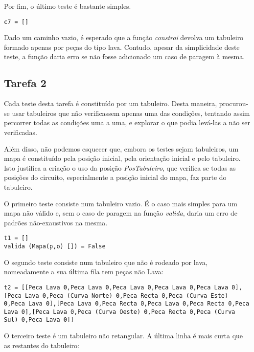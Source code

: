 \documentclass[a4paper]{report}
\begin{document}
Por fim, o último teste é bastante simples.

\begin{verbatim}
c7 = []
\end{verbatim}

Dado um caminho vazio, é esperado que a função \textit{constroi} devolva um tabuleiro formado apenas por peças do tipo lava. Contudo, apesar da simplicidade deste teste, a função daria erro se não fosse adicionado um caso de paragem à mesma.

\subsection{Tarefa 2}

Cada teste desta tarefa é constituído por um tabuleiro. Desta maneira, procurou-se usar tabuleiros que não verificassem apenas uma das condições, tentando assim percorrer todas as condições uma a uma, e explorar o que podia levá-las a não ser verificadas.

Além disso, não podemos esquecer que, embora os testes sejam tabuleiros, um mapa é constituído pela posição inicial, pela orientação inicial e pelo tabuleiro. Isto justifica a criação o uso da posição \textit{PosTabuleiro}, que verifica se todas as posições do circuito, especialmente a posição inicial do mapa, faz parte do tabuleiro.

O primeiro teste consiste num tabuleiro vazio. É o caso mais simples para um mapa não válido e, sem o caso de paragem na função \textit{valida}, daria um erro de padrões não-exaustivos na mesma.

\begin{verbatim}
t1 = []
valida (Mapa(p,o) []) = False
\end{verbatim}

O segundo teste consiste num tabuleiro que não é rodeado por lava, nomeadamente a sua última fila tem peças não Lava:

\begin{lstlisting}
t2 = [[Peca Lava 0,Peca Lava 0,Peca Lava 0,Peca Lava 0,Peca Lava 0],[Peca Lava 0,Peca (Curva Norte) 0,Peca Recta 0,Peca (Curva Este) 0,Peca Lava 0],[Peca Lava 0,Peca Recta 0,Peca Lava 0,Peca Recta 0,Peca Lava 0],[Peca Lava 0,Peca (Curva Oeste) 0,Peca Recta 0,Peca (Curva Sul) 0,Peca Lava 0]]
\end{lstlisting}

O terceiro teste é um tabuleiro não retangular. A última linha é mais curta que as restantes do tabuleiro:
\end{document}
